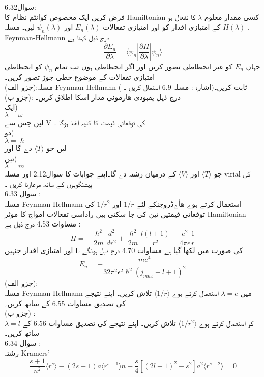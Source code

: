 \documentclass{book}
\begin{document}
سوال6.32:
\\
فرض کریں ایک مخصوص کوانٹم نظام کا  
Hamiltonian 
کسی مقدار معلوم
\(\lambda\)
 کا تفعال ہو .
\(H(\lambda)\)
کے امتیازی اقدار کو اور امتیازی تفعالات
\(E_{n}(\lambda)\)
اور
\(\psi_{n}(\lambda)\)
لیں۔ 
مسلہ Feynman-Hellmann درج ذیل کہتا ہے
\[\frac{\partial E_{n}}{\partial \lambda}=\big\langle{\psi_{n}|\frac{\partial{H}}{\partial{\lambda}}|\psi_{n}}\big\rangle\]
جہاں 
\(E_{n}\)
کو غیر انحطاطی تصور کریں اور اگر انحطاطی ہوں تب تمام 
\(\psi_{n}\)
کو انحطاطی امتیازی تفعالات کے موضوع خطی جوڑ تصور کریں۔\\
(جزو الف):مسلہ Feynman-Hellmann ثابت کریں۔(اشارہ : مسلہ 6.9 استمال کریں ۔ )\\
(جزو ب): درج ذیل یقبودی هارمونی مدار اسکا اطلاق کریں۔\\
ایک)\\
\(\lambda=\omega\)\\
لیں جس سے
V
کی توقعاتی قیمت کا کلیہ اخذ ہوگا ۔\\
دو)\\
\(\lambda=\hslash\)\\
لیں جو
\(\langle T \rangle\)
دے گا اور\\
تین)\\
\(\lambda=m\)\\
جو 
\(\langle T \rangle\)
اور 
\(\langle V \rangle\)
کے درمیان رشتہ دے گا۔اپنے جوابات کا سوال2.12 اور مسلہ virial کی پیشنگویوں  کے ساتھ موعازنا کریں ۔\\
سوال 6.33 : 
\\
مسلہ Feynman-Hellmann استعمال کرتے ہوے ھاٰےڈروجنکے لئے 
\(1/r\)
اور 
\(1/r^{2}\)
کی توقعاتی قیمتیں تین کی جا سکتی ہیں راداسی تفعالات امواج کا موثر 
Hamiltonian 
مساوات 4.53 درج ذیل ہے :
\[H=-\frac{\hslash^{2}}{2m}\frac{d^{2}}{dr^{2}}+\frac{\hslash^{2}}{2m}\frac{l(l+1)}{r^{2}}-\frac{e^{2}}{4\pi\epsilon}\frac{1}{r}\]
اور امتیازی اقدار جنہیں 
L
کی صورت میں لکھا گیا ہے مساوات 4.70 درج ذیل ہونگے 
\[E_n=-\frac{me^{4}}{32\pi^{2}\epsilon^{2}\hslash^{2}(j_{max}+l+1)^{2}}\]
(جزو الف):\\
 مسلہ Feynman-Hellmann میں 
\(\lambda=e\)
استعمال کرتے ہوے
\(\langle1/r\rangle\)
تلاش کریں۔ اپنے نتیجے کی تصدیق مساوات 6.55 کے ساتھ کریں۔\\
(جزو ب) :\\
\(\lambda=l\)
کو استعمال کرتے ہوے
\(\langle1/r^{2}\rangle\)
تلاش کریں۔ اپنے نتیجے کی تصدیق مساوات 6.56 کے ساتھ کریں۔\\
سوال 6.34 :\\
 رشتہ Kramers' 
\[\frac{s+1}{n^{2}}\langle r^{s}\rangle -(2s+1)a\langle r^{s-1}\rangle n+\frac{s}{4}[(2l+1)^{2}-s^{2}]a^{2}\langle r^{s-2}\rangle =0\]
\end{document}
